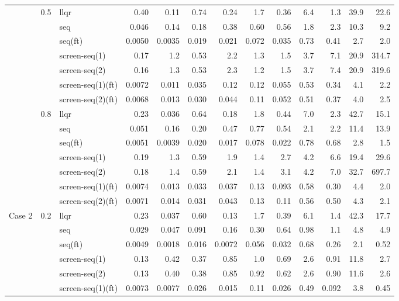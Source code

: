 \begin{longtable}{lllrrrrrrrrrr}
\midrule
 & 0.5 & llqr & 0.40 & 0.11 & 0.74 & 0.24 & 1.7 & 0.36 & 6.4 & 1.3 & 39.9 & 22.6\\
 &  & seq & 0.046 & 0.14 & 0.18 & 0.38 & 0.60 & 0.56 & 1.8 & 2.3 & 10.3 & 9.2\\
 &  & seq(ft) & 0.0050 & 0.0035 & 0.019 & 0.021 & 0.072 & 0.035 & 0.73 & 0.41 & 2.7 & 2.0\\
 &  & screen-seq(1) & 0.17 & 1.2 & 0.53 & 2.2 & 1.3 & 1.5 & 3.7 & 7.1 & 20.9 & 314.7\\
 &  & screen-seq(2) & 0.16 & 1.3 & 0.53 & 2.3 & 1.2 & 1.5 & 3.7 & 7.4 & 20.9 & 319.6\\
 &  & screen-seq(1)(ft) & 0.0072 & 0.011 & 0.035 & 0.12 & 0.12 & 0.055 & 0.53 & 0.34 & 4.1 & 2.2\\
 &  & screen-seq(2)(ft) & 0.0068 & 0.013 & 0.030 & 0.044 & 0.11 & 0.052 & 0.51 & 0.37 & 4.0 & 2.5\\
\midrule
 & 0.8 & llqr & 0.23 & 0.036 & 0.64 & 0.18 & 1.8 & 0.44 & 7.0 & 2.3 & 42.7 & 15.1\\
 &  & seq & 0.051 & 0.16 & 0.20 & 0.47 & 0.77 & 0.54 & 2.1 & 2.2 & 11.4 & 13.9\\
 &  & seq(ft) & 0.0051 & 0.0039 & 0.020 & 0.017 & 0.078 & 0.022 & 0.78 & 0.68 & 2.8 & 1.5\\
 &  & screen-seq(1) & 0.19 & 1.3 & 0.59 & 1.9 & 1.4 & 2.7 & 4.2 & 6.6 & 19.4 & 29.6\\
 &  & screen-seq(2) & 0.18 & 1.4 & 0.59 & 2.1 & 1.4 & 3.1 & 4.2 & 7.0 & 32.7 & 697.7\\
 &  & screen-seq(1)(ft) & 0.0074 & 0.013 & 0.033 & 0.037 & 0.13 & 0.093 & 0.58 & 0.30 & 4.4 & 2.0\\
 &  & screen-seq(2)(ft) & 0.0071 & 0.014 & 0.031 & 0.043 & 0.13 & 0.11 & 0.56 & 0.50 & 4.3 & 2.1\\
\midrule
Case 2 & 0.2 & llqr & 0.23 & 0.037 & 0.60 & 0.13 & 1.7 & 0.39 & 6.1 & 1.4 & 42.3 & 17.7\\
 &  & seq & 0.029 & 0.047 & 0.091 & 0.16 & 0.30 & 0.64 & 0.98 & 1.1 & 4.8 & 4.9\\
 &  & seq(ft) & 0.0049 & 0.0018 & 0.016 & 0.0072 & 0.056 & 0.032 & 0.68 & 0.26 & 2.1 & 0.52\\
 &  & screen-seq(1) & 0.13 & 0.42 & 0.37 & 0.85 & 1.0 & 0.69 & 2.6 & 0.91 & 11.8 & 2.7\\
 &  & screen-seq(2) & 0.13 & 0.40 & 0.38 & 0.85 & 0.92 & 0.62 & 2.6 & 0.90 & 11.6 & 2.6\\
 &  & screen-seq(1)(ft) & 0.0073 & 0.0077 & 0.026 & 0.015 & 0.11 & 0.026 & 0.49 & 0.092 & 3.8 & 0.45\\

\end{longtable}
